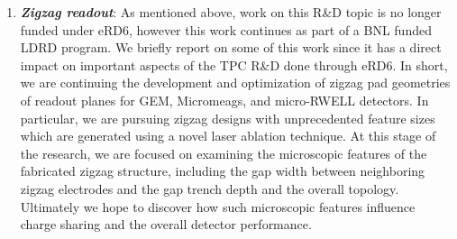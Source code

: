 \begin{enumerate}
\item	\textbf{\emph{Zigzag readout}}: As mentioned above, work on this R\&D topic is no longer funded under eRD6, however this work continues as part of a BNL funded LDRD program. We briefly report on some of this work since it has a direct impact on important aspects of the TPC R\&D done through eRD6. In short, we are continuing the development and optimization of zigzag pad geometries of readout planes for GEM, Micromeags, and micro-RWELL detectors. In particular, we are pursuing zigzag designs with unprecedented feature sizes which are generated using a novel laser ablation technique. At this stage of the research, we are focused on examining the microscopic features of the fabricated zigzag structure, including the gap width between neighboring zigzag electrodes and the gap trench depth and the overall topology. Ultimately we hope to discover how such microscopic features influence charge sharing and the overall detector performance. 



\end{enumerate}